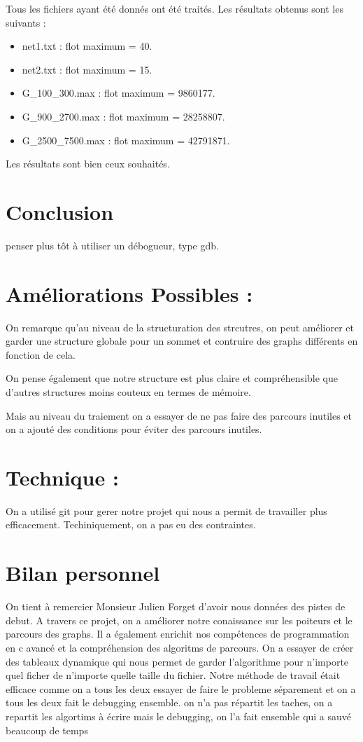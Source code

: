 \documentclass[11pt, a4paper]{report}
\begin{document}
	Tous les fichiers ayant été donnés ont été traités. Les résultats obtenus sont les suivants :
	\begin{itemize}
        \item net1.txt : flot maximum = 40.
        \item net2.txt : flot maximum = 15.
        \item G\_100\_300.max : flot maximum = 9860177.
        \item G\_900\_2700.max : flot maximum = 28258807.
        \item G\_2500\_7500.max : flot maximum = 42791871.
	\end{itemize}

	Les résultats sont bien ceux souhaités.


	\chapter*{Conclusion}
	penser plus tôt à utiliser un débogueur, type gdb.

	\chapter{Améliorations Possibles :}

	On remarque qu'au niveau de la structuration des strcutres, on peut améliorer et garder une structure globale pour un sommet et contruire des graphs différents en fonction de cela.

	On pense également que notre structure est plus claire et compréhensible que d'autres structures moins couteux en termes de mémoire.

	Mais au niveau du traiement on a essayer de ne pas faire des parcours inutiles et on a ajouté des conditions pour éviter des parcours inutiles.



	 \chapter{Technique :}

	 On a utilisé git pour gerer notre projet qui nous a permit de travailler plus efficacement. Techiniquement, on a pas eu des contraintes.

	\chapter*{Bilan personnel}
	On tient à remercier Monsieur Julien Forget d'avoir nous données des pistes de debut. A travers ce projet, on a améliorer notre conaissance sur les poiteurs et le parcours des graphs. Il a également enrichit nos compétences de programmation en c avancé et la compréhension des algoritms de parcours.
	On a essayer de créer des tableaux dynamique qui nous permet de garder l'algorithme pour n'importe quel ficher de n'importe quelle taille du fichier.
	Notre méthode de travail était efficace comme on a tous les deux essayer de faire le probleme séparement et on a tous les deux fait le debugging ensemble. on n'a pas répartit les taches, on a repartit les algortims à écrire mais le debugging, on l'a fait ensemble qui a sauvé beaucoup de temps
\end{document}
